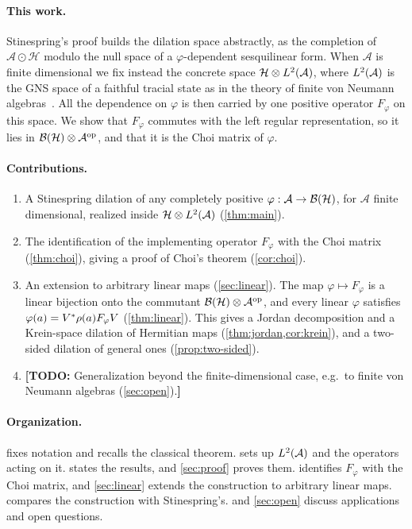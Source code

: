 \documentclass[12pt]{article}
\newcommand{\todo}[1]{\textcolor{\mysubcolor}{\small\textbf{[TODO:} #1\textbf{]}}}
\newcommand{\alg}{\mathcal{A}}             %
\newcommand{\hilb}{\mathcal{H}}            %
\newcommand{\bdd}[1]{\mathcal{B}\br{#1}}   %
\newcommand{\algtensor}{\odot}             %
\newcommand{\op}{^{\mathrm{op}}}           %
\newcommand{\Ltwo}{L^2\br{\alg}}           %
\newcommand{\Ltn}{\hilb \tensor \Ltwo}     %
\newcommand{\Fphi}{F_{\varphi}}            %
\begin{document}
\paragraph{This work.}
Stinespring's proof builds the dilation space abstractly, as the completion of
\(\alg \algtensor \hilb\) modulo the null space of a \(\varphi\)-dependent
sesquilinear form. When \(\alg\) is finite dimensional we fix instead the
concrete space \(\Ltn\), where \(\Ltwo\) is the GNS space of a faithful tracial
state as in the theory of finite von Neumann algebras~\cite{AnantharamanPopa}.
All the dependence on \(\varphi\) is then carried by one positive operator
\(\Fphi\) on this space. We show that \(\Fphi\) commutes with the left regular
representation, so it lies in \(\bdd{\hilb} \tensor \alg\op\), and that it is the
Choi matrix of \(\varphi\).

\paragraph{Contributions.}
\begin{enumerate}[label=(\arabic*)]
  \item A Stinespring dilation of any completely positive
    \(\varphi : \alg \to \bdd{\hilb}\), for \(\alg\) finite dimensional, realized
    inside \(\Ltn\) (\cref{thm:main}).
  \item The identification of the implementing operator \(\Fphi\) with the Choi
    matrix (\cref{thm:choi}), giving a proof of Choi's theorem
    (\cref{cor:choi}).
  \item An extension to arbitrary linear maps (\cref{sec:linear}). The map
    \(\varphi \mapsto \Fphi\) is a linear bijection onto the commutant
    \(\bdd{\hilb} \tensor \alg\op\), and every linear \(\varphi\) satisfies
    \(\varphi(a) = V^\adjoint\rho(a)\Fphi V\) (\cref{thm:linear}). This gives a
    Jordan decomposition and a Krein-space dilation of Hermitian maps
    (\cref{thm:jordan,cor:krein}), and a two-sided dilation of general ones
    (\cref{prop:two-sided}).
  \item \todo{Generalization beyond the finite-dimensional case, e.g.\ to finite
    von Neumann algebras (\cref{sec:open}).}
\end{enumerate}

\paragraph{Organization.}
 fixes notation and recalls the classical theorem.
 sets up \(\Ltwo\) and the operators acting on it.
 states the results, and \cref{sec:proof} proves them.
 identifies \(\Fphi\) with the Choi matrix, and
\cref{sec:linear} extends the construction to arbitrary linear maps.
 compares the construction with Stinespring's.
 and \cref{sec:open} discuss applications and open
questions.
\end{document}
